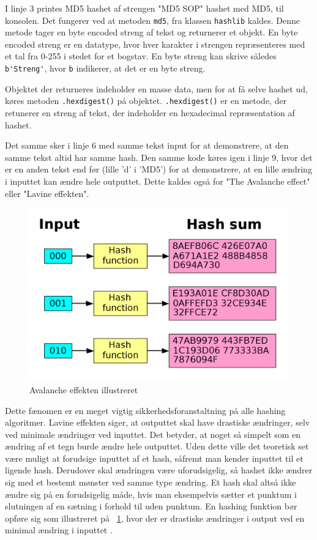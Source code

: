 \documentclass[12pt]{article}
\begin{document}
I linje 3 printes MD5 hashet af strengen "MD5 SOP" hashet med MD5, til konsolen. Det fungerer ved at metoden \verb|md5|, fra klassen \verb|hashlib| kaldes. Denne metode tager en byte encoded streng af tekst og returnerer et objekt. En byte encoded streng er en datatype, hvor hver karakter i strengen repræsenteres med et tal fra 0-255 i stedet for et bogstav. En byte streng kan skrive således \verb|b'Streng'|, hvor \verb|b| indikerer, at det er en byte streng. 

Objektet der returneres indeholder en masse data, men for at få selve hashet ud, køres metoden \verb|.hexdigest()| på objektet. \verb|.hexdigest()| er en metode, der retunerer en streng af tekst, der indeholder en hexadecimal repræsentation af hashet. 


Det samme sker i linje 6 med samme tekst input for at demonstrere, at den samme tekst altid har samme hash. Den samme kode køres igen i linje 9, hvor det er en anden tekst end før (lille 'd' i 'MD5') for at demonstrere, at en lille ændring i inputtet kan ændre hele outputtet. Dette kaldes også for "The Avalanche effect" eller "Lavine effekten".

\begin{figure}[h]
\includegraphics[width=0.7\linewidth]{Avalanche.png} 
\centering
\caption{Avalanche effekten illustreret \cite{wiki:avalance}}
\label{fig:avalanche-example}
\end{figure}

Dette fænomen er en meget vigtig sikkerhedsforanstaltning på alle hashing algoritmer. Lavine effekten siger, at outputtet skal have drastiske ændringer, selv ved minimale ændringer ved inputtet. Det betyder, at noget så simpelt som en ændring af et tegn burde ændre hele outputtet. Uden dette ville det teoretisk set være muligt at forudsige inputtet af et hash, såfremt man kender inputtet til et ligende hash. Derudover skal ændringen være uforudsigelig, så hashet ikke ændrer sig med et bestemt mønster ved samme type ændring. Et hash skal altså ikke ændre sig på en forudsigelig måde, hvis man eksempelvis sætter et punktum i slutningen af en sætning i forhold til uden punktum. En hashing funktion bør opføre sig som illustreret på \figurename{~\ref{fig:avalanche-example}}, hvor der er drastiske ændringer i output ved en minimal ændring i inputtet \cite{al-kuwari_cryptographic_nodate}.
\end{document}
